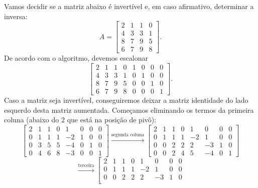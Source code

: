 \begin{ex}
	Vamos decidir se a matriz abaixo é invertível e, em caso afirmativo, determinar a inversa:
	\begin{equation}
	A =
	\left[
	\begin{array}{cccc}
	2 & 1 & 1 & 0 \\
	4 & 3 & 3 & 1 \\
	8 & 7 & 9 & 5 \\
	6 & 7 & 9 & 8 
	\end{array}
	\right].
	\end{equation} De acordo com o algoritmo, devemos escalonar
	\begin{equation}
	\left[
	\begin{array}{cccc|cccc}
	2 & 1 & 1 & 0 & 1 & 0 & 0 & 0 \\
	4 & 3 & 3 & 1 & 0 & 1 & 0 & 0 \\
	8 & 7 & 9 & 5 & 0 & 0 & 1 & 0 \\
	6 & 7 & 9 & 8 & 0 & 0 & 0 & 1 
	\end{array}
	\right].
	\end{equation} Caso a matriz seja invertível, conseguiremos deixar a matriz identidade do lado esquerdo desta matriz aumentada. Começamos eliminando os termos da primeira coluna (abaixo do $2$ que está na posição de pivô):
	\begin{equation}
	\left[
	\begin{array}{cccc|cccc}
	2 & 1 & 1 & 0 & 1 & 0 & 0 & 0 \\
	0 & 1 & 1 & 1 & -2 & 1 & 0 & 0 \\
	0 & 3 & 5 & 5 & -4 & 0 & 1 & 0 \\
	0 & 4 & 6 & 8 & -3 & 0 & 0 & 1 
	\end{array}
	\right] \xrightarrow{\text{segunda coluna}}
	\left[
	\begin{array}{cccc|cccc}
	2 & 1 & 1 & 0 & 1 & 0 & 0 & 0 \\
	0 & 1 & 1 & 1 & -2 & 1 & 0 & 0 \\
	0 & 0 & 2 & 2 & 2 & -3 & 1 & 0 \\
	0 & 0 & 2 & 4 & 5 & -4 & 0 & 1 
	\end{array}
	\right]
	\end{equation}
	\begin{equation}
	\xrightarrow{\text{terceira}}
	\left[
	\begin{array}{cccc|cccc}
	2 & 1 & 1 & 0 & 1 & 0 & 0 & 0 \\
	0 & 1 & 1 & 1 & -2 & 1 & 0 & 0 \\
	0 & 0 & 2 & 2 & 2 & -3 & 1 & 0 \\

\end{array}
\end{equation}
\end{ex}
